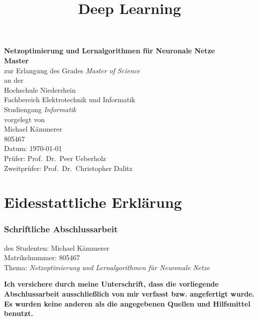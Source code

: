 \documentclass[12pt]{article}
\title{Deep Learning}
\begin{document}
	\begin{titlepage}
		\begin{center}
			{\Large\bf Netzoptimierung und Lernalgorithmen für Neuronale Netze}\\[2cm]

			{\bf Master}\\
			zur Erlangung des Grades {\em Master of Science}\\[1.5cm]

			an der\\
			Hochschule Niederrhein\\
			Fachbereich Elektrotechnik und Informatik\\
			Studiengang {\em Informatik}\\[3cm]

			vorgelegt von\\
			Michael Kämmerer\\
			805467 \\[3cm]
			Datum: \today\\[3cm]

			Prüfer: Prof.~Dr.~Peer Ueberholz\\
			Zweitprüfer: Prof.~Dr.~Christopher Dalitz
		\end{center}
	\end{titlepage}
	
	

\section*{Eidesstattliche Erklärung}
\subsubsection*{Schriftliche Abschlussarbeit}
des Studenten: Michael Kämmerer\\
Matrikelnummer: 805467\\



Thema: {\em Netzoptimierung und Lernalgorithmen für Neuronale Netze} \newline

\textbf{Ich versichere durch meine Unterschrift, dass die vorliegende Abschlussarbeit 
 ausschließlich von mir verfasst bzw. angefertigt wurde. Es wurden keine anderen als die 
  angegebenen Quellen und Hilfsmittel benutzt.}
\end{document}
